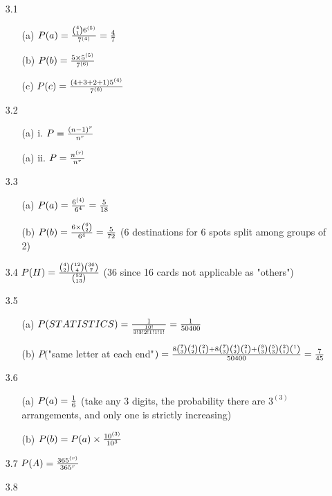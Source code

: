 \documentclass[english, 11pt]{article}
\begin{document}
  \begin{itemize}
    \item[3.1]
    \begin{itemize}
      \item[(a)] $P(a) = \frac{{4 \choose 1}6^{(5)}}{7^{(4)}} = \frac{4}{7}$
      \item[(b)] $P(b) = \frac{5\times5^{(5)}}{7^{(6)}}$
      \item[(c)] $P(c) = \frac{(4+3+2+1)5^{(4)}}{7^{(6)}}$
    \end{itemize}
    \item[3.2]
    \begin{itemize}
      \item[(a) i.] $P = \frac{(n-1)^{r}}{n^{r}}$
      \item[(a) ii.] $P = \frac{n^{(r)}}{n^{r}}$
    \end{itemize}
    \item[3.3]
    \begin{itemize}
      \item[(a)] $P(a) = \frac{6^{(4)}}{6^4} = \frac{5}{18}$
      \item[(b)] $P(b) = \frac{6\times{6 \choose 2}}{6^4} = \frac{5}{72}$ (6 destinations for 6 spots split among groups of 2)
    \end{itemize}
    \item[3.4] $P(H) = \frac{{4 \choose 2}{12 \choose 4}{36 \choose 7}}{{52 \choose 13}}$ (36 since 16 cards not applicable as "others")
    \item[3.5]
    \begin{itemize}
      \item[(a)] $P(STATISTICS) = \frac{1}{\frac{10!}{3!3!2!1!1!1!}} = \frac{1}{50400}$
      \item[(b)] $P($"same letter at each end"$) = \frac{8{7 \choose 3}{4 \choose 2}{2 \choose 1} + 8{7 \choose 3}{4 \choose 2}{2 \choose 1} + {8 \choose 3}{5 \choose 3}{2 \choose 1}{1 \choose }}{50400} = \frac{7}{45}$
    \end{itemize}
    \item[3.6]
    \begin{itemize}
      \item[(a)] $P(a) = \frac{1}{6}$ (take any 3 digits, the probability there are $3^{(3)}$ arrangements, and only one is strictly increasing)
      \item[(b)] $P(b) = P(a) \times \frac{10^{(3)}}{10^3}$
    \end{itemize}
    \item[3.7]$P(A) = \frac{365^{(r)}}{365^{r}} $
    \item[3.8]
    \begin{itemize}

\end{itemize}
\end{itemize}
\end{document}
